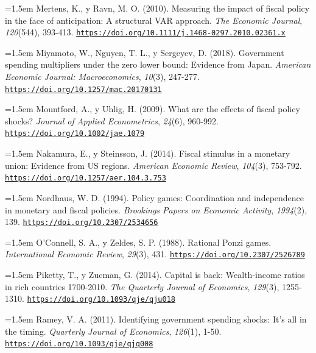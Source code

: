 \documentclass[10pt,a4paper]{article}
\begin{document}
\noindent\hangindent=1.5em Mertens, K., y Ravn, M. O. (2010). Measuring the impact of fiscal policy in the face of anticipation: A structural VAR approach. \textit{The Economic Journal}, \textit{120}(544), 393-413. \href{https://doi.org/10.1111/j.1468-0297.2010.02361.x}{\nolinkurl{https://doi.org/10.1111/j.1468-0297.2010.02361.x}}

\noindent\hangindent=1.5em Miyamoto, W., Nguyen, T. L., y Sergeyev, D. (2018). Government spending multipliers under the zero lower bound: Evidence from Japan. \textit{American Economic Journal: Macroeconomics}, \textit{10}(3), 247-277. \href{https://doi.org/10.1257/mac.20170131}{\nolinkurl{https://doi.org/10.1257/mac.20170131}}

\noindent\hangindent=1.5em Mountford, A., y Uhlig, H. (2009). What are the effects of fiscal policy shocks? \textit{Journal of Applied Econometrics}, \textit{24}(6), 960-992. \href{https://doi.org/10.1002/jae.1079}{\nolinkurl{https://doi.org/10.1002/jae.1079}}

\noindent\hangindent=1.5em Nakamura, E., y Steinsson, J. (2014). Fiscal stimulus in a monetary union: Evidence from US regions. \textit{American Economic Review}, \textit{104}(3), 753-792. \href{https://doi.org/10.1257/aer.104.3.753}{\nolinkurl{https://doi.org/10.1257/aer.104.3.753}}

\noindent\hangindent=1.5em Nordhaus, W. D. (1994). Policy games: Coordination and independence in monetary and fiscal policies. \textit{Brookings Papers on Economic Activity}, \textit{1994}(2), 139. \href{https://doi.org/10.2307/2534656}{\nolinkurl{https://doi.org/10.2307/2534656}}

\noindent\hangindent=1.5em O'Connell, S. A., y Zeldes, S. P. (1988). Rational Ponzi games. \textit{International Economic Review}, \textit{29}(3), 431. \href{https://doi.org/10.2307/2526789}{\nolinkurl{https://doi.org/10.2307/2526789}}

\noindent\hangindent=1.5em Piketty, T., y Zucman, G. (2014). Capital is back: Wealth-income ratios in rich countries 1700-2010. \textit{The Quarterly Journal of Economics}, \textit{129}(3), 1255-1310. \href{https://doi.org/10.1093/qje/qju018}{\nolinkurl{https://doi.org/10.1093/qje/qju018}}

\noindent\hangindent=1.5em Ramey, V. A. (2011). Identifying government spending shocks: It's all in the timing. \textit{Quarterly Journal of Economics}, \textit{126}(1), 1-50. \href{https://doi.org/10.1093/qje/qjq008}{\nolinkurl{https://doi.org/10.1093/qje/qjq008}}
\end{document}
